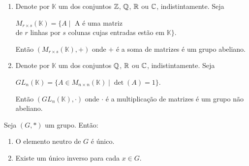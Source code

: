 \documentclass{beamer}
\begin{document}
    \begin{frame}
        \begin{exemplos}
            \begin{enumerate}[label={\arabic*})]
                \conti

                \item Denote por $\mathbb{K}$ um dos conjuntos $\mathbb{Z}$, $\mathbb{Q}$, $\mathbb{R}$ ou $\mathbb{C}$, indistintamente. Seja
                \begin{center}
                    $M_{r \times s}(\mathbb{K}) = \{A \mid $ A é uma matriz \\de $r$ linhas por $s$ colunas cujas entradas estão em $\mathbb{K}\}$.
                \end{center}
                Então $(M_{r \times s}(\mathbb{K}), +)$ onde $+$ é a soma de matrizes é um grupo abeliano.

                \vspace{.3cm}

                \item Denote por $\mathbb{K}$ um dos conjuntos $\mathbb{Q}$, $\mathbb{R}$ ou $\mathbb{C}$, indistintamente. Seja
                \begin{center}
                    $GL_n(\mathbb{K}) = \{A \in M_{n \times n}(\mathbb{K}) \mid \det(A) = 1\}$.
                \end{center}
                Então $(GL_n(\mathbb{K}), \cdot)$ onde $\cdot$ é a multiplicação de matrizes é um grupo não abeliano.
            \end{enumerate}
        \end{exemplos}
    \end{frame}

    \begin{frame}
        \begin{proposicao}
            Seja $(G,*)$ um grupo. \pause Ent\~ao:\pause
            \begin{enumerate}[label={\roman*})]
                \item O elemento neutro de $G$ {\'e} {\'u}nico.\pause

                \vspace{.3cm}

                \item Existe um {\'u}nico inverso para cada $x \in G$.\pause

                \seti
            \end{enumerate}
        \end{proposicao}
    \end{frame}
\end{document}
